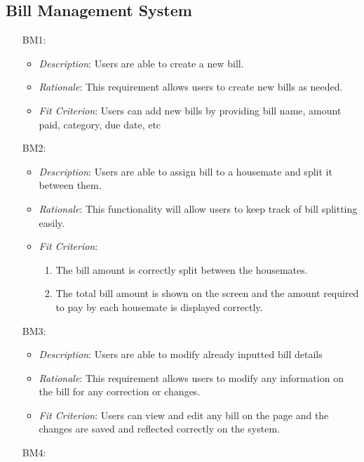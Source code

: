 \documentclass[12pt]{article}
\begin{document}
\subsection{Bill Management System}
\noindent \begin{itemize}
    \item[BM1:] 
    \begin{itemize}
        \item \textit{Description}: Users are able to create a new bill.
        \item \textit{Rationale}: This requirement allows users to create new bills as needed.
        \item \textit{Fit Criterion}: Users can add new bills by providing bill name, amount paid, category, due date, etc
    \end{itemize}
    \item[BM2:] 
    \begin{itemize}
        \item \textit{Description}: Users are able to assign bill to a housemate and split it between them.
        \item \textit{Rationale}: This functionality will allow users to keep track of bill splitting easily.
        \item \textit{Fit Criterion}: 
        \begin{enumerate}
            \item The bill amount is correctly split between the housemates.
            \item The total bill amount is shown on the screen and the amount required to pay by each housemate is displayed correctly.
        \end{enumerate}
    \end{itemize}
    \item[BM3:] 
    \begin{itemize}
        \item \textit{Description}: Users are able to modify already inputted bill details 
        \item \textit{Rationale}: This requirement allows users to modify any information on the bill for any correction or changes.
        \item \textit{Fit Criterion}: Users can view and edit any bill on the page and the changes are saved and reflected correctly on the system.
    \end{itemize}
    \item[BM4:] 
    \begin{itemize}

\end{itemize}
\end{itemize}
\end{document}
